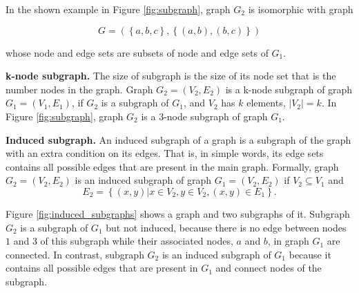 In the shown example in Figure \ref{fig:subgraph}, graph $G_2$ is isomorphic with graph 

\begin{equation}
G = \left( \left\{ a,b,c \right\}, \left\{ \left( a , b \right),\left( b , c \right) \right\} \right) 
\end{equation}

whose node and edge sets are subsets of node and edge sets of $G_1$.

\textbf{k-node subgraph.}
%
The size of subgraph is the size of its node set that is the number nodes in the graph. 
Graph $G_2 = \left( V_2 , E_2 \right)$ is a k-node subgraph of graph $G_1 = \left( V_1, E_1 \right)$, if $G_2$ is a subgraph of $G_1$, and $V_2$ has $k$ elements, $|V_2|=k$. 
In Figure \ref{fig:subgraph}, graph $G_2$ is a 3-node subgraph of graph $G_1$. 


\textbf{Induced subgraph.} 
%
An induced subgraph of a graph is a subgraph of the graph with an extra condition on its edges.  
That is, in simple words, its edge sets contains all possible edges that are present in the main graph. 
Formally, graph $G_2 = (V_2, E_2)$ is an induced subgraph of graph $G_1 = (V_2, E_2)$ if $V_2 \subseteq V_1$ and 
\begin{equation}
E_2 = \left\{ (x,y)| x \in V_2, y \in V_2, (x,y) \in E_1   \right\}. 
\end{equation}

Figure \ref{fig:induced_subgraphs} shows a graph and two subgraphs of it. 
Subgraph $G_2$ is a subgraph of $G_1$ but not induced, because there is no edge between nodes $1$ and $3$ of this subgraph while their associated nodes, $a$ and $b$, in graph $G_1$ are connected. 
In contrast, subgraph $G_2$ is an induced subgraph of $G_1$ because it contains all possible edges that are present in $G_1$ and connect nodes of the subgraph.  

